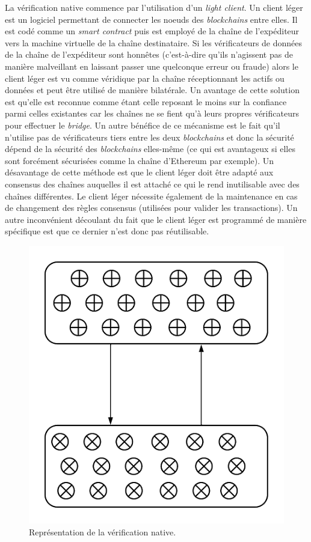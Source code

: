 La vérification native commence par l’utilisation d’un \textit{light client}\cite{NomadDocsNative}. Un client léger est un logiciel permettant de connecter les noeuds des \textit{blockchains} entre elles. Il est codé comme un \textit{smart contract} puis est employé de la chaîne de l'expéditeur vers la machine virtuelle de la chaîne destinataire. Si les vérificateurs de données de la chaîne de l'expéditeur sont honnêtes (c’est-à-dire qu’ils n’agissent pas de manière malveillant en laissant passer une quelconque erreur ou fraude) alors le client léger est vu comme véridique par la chaîne réceptionnant les actifs ou données et peut être utilisé de manière bilatérale.
 Un avantage de cette solution est qu’elle est reconnue comme étant celle reposant le moins sur la confiance parmi celles existantes car les chaînes ne se fient qu’à leurs propres vérificateurs pour effectuer le \textit{bridge}. Un autre bénéfice de ce mécanisme est le fait qu’il n’utilise pas de vérificateurs tiers entre les deux \textit{blockchains} et donc la sécurité dépend de la sécurité des \textit{blockchains} elles-même (ce qui est avantageux si elles sont forcément sécurisées comme la chaîne d’Ethereum par exemple).
 Un désavantage de cette méthode est que le client léger doit être adapté aux consensus des chaînes auquelles il est attaché ce qui le rend inutilisable avec des chaînes différentes. Le client léger nécessite également de la maintenance en cas de changement des règles consensus (utilisées pour valider les transactions). Un autre inconvénient découlant du fait que le client léger est programmé de manière spécifique est que ce dernier n’est donc pas réutilisable. \\
 \begin{figure}[h!]
    \centering
\includegraphics[scale=0.70]{centralisation/imagesBridges/DiagrammeVerifNative.png}
\caption{Représentation de la vérification native.}
\label{fig:NativeVerif}
\end{figure}


